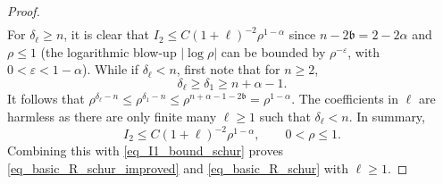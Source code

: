 \documentclass[10pt,a4paper]{amsart}
\begin{document}
\begin{proof}
\begin{align*}
\end{align*}
For $\delta_\ell \ge n$, it is clear that $I_2 \le C (1+\ell)^{-2} \rho^{1-\alpha}$ since $n-2\mathfrak b=2-2\alpha$ and $\rho\le 1$ (the logarithmic blow-up $|\log{\rho}|$ can be bounded by $\rho^{-\varepsilon}$, with $0<\varepsilon<1-\alpha$). While if $\delta_\ell <n$, first note that for $n\ge 2$, 
\begin{equation}\label{eq_delta_lower}
    \delta_\ell \ge \delta_1\geq n+\alpha-1.
\end{equation}
It follows that $\rho^{\delta_\ell-n} \le \rho^{\delta_1-n} \le \rho^{n+\alpha-1-2\mathfrak b} = \rho^{1-\alpha}$. The coefficients in $\ell$ are harmless as there are only finite many $\ell\ge 1$ such that $\delta_\ell < n$. In summary, 
\begin{equation*}
    I_2 \le C (1+\ell)^{-2} \rho^{1-\alpha},\qquad 0<\rho \le 1.
\end{equation*}
Combining this with \eqref{eq_I1_bound_schur} proves \eqref{eq_basic_R_schur_improved} and \eqref{eq_basic_R_schur} with $\ell \ge 1$.




\end{proof}
\end{document}
